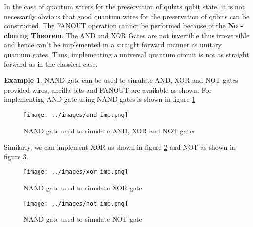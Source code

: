 \documentclass[12pt, oneside]{book}
\theoremstyle{definition}
\theoremstyle{definition}
\newtheorem{example}{Example}[section]
\theoremstyle{remark}
\begin{document}
In the case of quantum wirers for the preservation of qubits qubit state, it is not necessarily obvious that good quantum wires for
the preservation of qubits can be constructed. The FANOUT operation cannot be performed because of the \textbf{No - cloning Theorem}.
The AND and XOR Gates are not invertible thus irreversible and hence can't be implemented in a straight forward manner as unitary quantum gates.
Thus, implementing a universal quantum circuit is not as straight forward as in the classical case.

\begin{example}
    NAND gate can be used to simulate AND, XOR and NOT gates provided wires, ancilla bits and FANOUT are available as shown.
    For implementing AND gate using NAND gates is shown in figure \ref{fig:and_imp}
    \begin{figure}[H]
        \centering
        \texttt{[image: ../images/and\_imp.png]}
        \caption{NAND gate used to simulate AND, XOR and NOT gates}
        \label{fig:and_imp}
    \end{figure}
    Similarly, we can implement XOR as shown in figure \ref{fig:xor_imp} and NOT as shown in figure \ref{fig:not_imp}.
    \begin{figure}[H]
        \centering
        \texttt{[image: ../images/xor\_imp.png]}
        \caption{NAND gate used to simulate XOR gate}
        \label{fig:xor_imp}
    \end{figure}
    \begin{figure}[H]
        \centering
        \texttt{[image: ../images/not\_imp.png]}
        \caption{NAND gate used to simulate NOT gate}
        \label{fig:not_imp}
    \end{figure}

\end{example}



\backmatter  %
    
    
\end{document}
